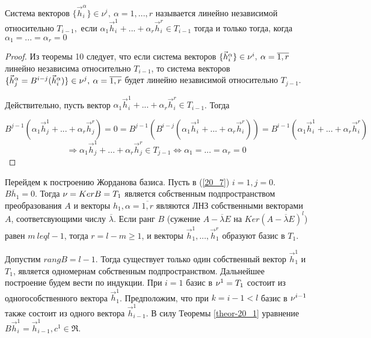 \begin{definition}
Система векторов $\{\vec{h}_i^{\alpha}\} \in \nu^i, \: \alpha = 1,...,r$ называется линейно  независимой относительно $T_{i - 1},$ если $\alpha_1 \vec{h}_i^1 + ... + \alpha_r \vec{h}_i^r \in T_{i-1}$ тогда и только тогда, когда $\alpha_1 = ... = \alpha_r = 0$
\begin{proof}
Из теоремы 10 следует, что если система векторов $\{\vec{h}_i^{\alpha}\} \in \nu^i, \: \alpha = \overline{1,r}$ линейно независима относительно $T_{i-1}$, то система векторов $\{\vec{h}_j^{\alpha} = B^{i-j} (\vec{h}^\alpha_i ) \} \in  \nu^j, \: \alpha = \overline{1,r}$ будет линейно независимой относительно $T_{j-1}.$

Действительно, пусть вектор $\alpha_1 \vec{h}_i^1 + ... + \alpha_r \vec{h}_i^r \in T_{i-1}$. Тогда

\[B^{j-1} (\alpha_1 \vec{h}_j^1 + ... + \alpha_r \vec{h}_j^r) = 0= B^{j - 1} ( B^{i - j} (\alpha_1 \vec{h}_i^1 + ... + \alpha_r \vec{h}_i^r)) = B^{i - 1}(\alpha_1 \vec{h}_i^1 + ... + \alpha_r \vec{h}_i^r)\] 
\[\Rightarrow \alpha_1 \vec{h}_j^1 + ... + \alpha_r \vec{h}_j^r \in T_{j-1} \Leftrightarrow \alpha_1 = ... = \alpha_r = 0\]
\end{proof}
\end{definition}

Перейдем к построению Жорданова базиса. Пусть в (\ref{20_7}) $i = 1, j = 0$. $B\overline{h}_1 = 0$. Тогда $\nu = Ker B = T_1$ является собственным подпространством преобразования $A$ и векторы $h_1, \alpha = \overline{1,r}$ являются ЛНЗ собственными векторами $A$, соответсвующими числу $\overline{\lambda}$. Если ранг $B$ (сужение $A - \overline{\lambda} E$ на $Ker (A - \overline{\lambda} E)^l$) равен $m \ leq l - 1$, тогда $r = l - m \geq 1$, и векторы $\vec{h}_1^1, ... , \vec{h}_1^r$ образуют базис в $T_1$.

Допустим $rangB = l - 1$. Тогда существует только один собственный вектор $\vec{h}_1^1$ и $T_1$, является одномернам собственным подпространством. Дальнейшее построение будем вести по индукции. При $i = 1$ базис в $\nu^1 = T_1$ состоит из одногособственного вектора $\vec{h}_1^1$. Предположим, что при $k = i - 1 < l$ базис в $\nu^{i-1}$ также состоит из одного вектора $\vec{h}_{i - 1}^1$. В силу Теоремы \ref{theor-20_1} уравнение $B\vec{h}_i^1 = \vec{h}_{i-1}^1, c^1\in \Re$.

